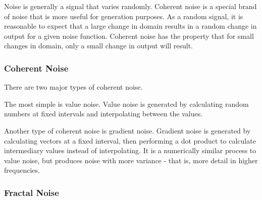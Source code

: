 Noise is generally a signal that varies randomly.
Coherent noise is a special brand of noise that is more useful for generation purposes.
As a random signal, it is reasonable to expect that a large change in domain results in a random change in output for a given noise function.
Coherent noise has the property that for small changes in domain, only a small change in output will result.



\subsubsection{Coherent Noise}

There are two major types of coherent noise.


The most simple is value noise.
Value noise is generated by calculating random numbers at fixed intervals and interpolating between the values.



Another type of coherent noise is gradient noise.
Gradient noise is generated by calculating vectors at a fixed interval, then performing a dot product to calculate intermediary values instead of interpolating.
It is a numerically similar process to value noise, but produces noise with more variance - that is, more detail in higher frequencies.


\subsubsection{Fractal Noise}

